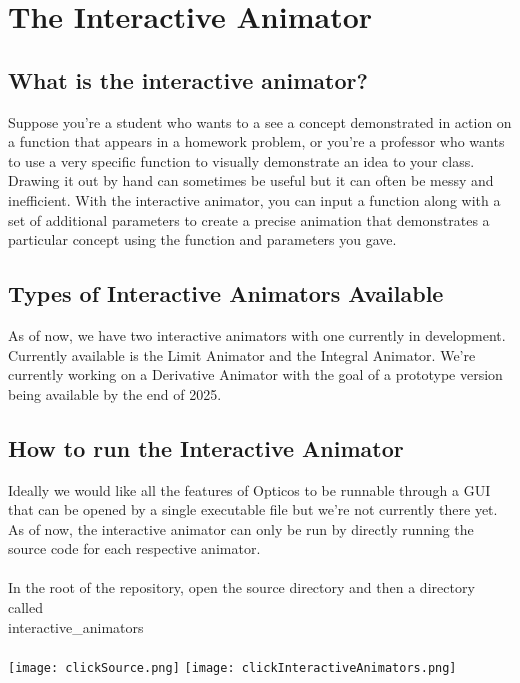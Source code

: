 \documentclass{article}
\begin{document}
\section*{The Interactive Animator}

\subsection*{What is the interactive animator?}
 Suppose you're a student who wants to a see a concept demonstrated in action on a function that appears in a homework problem, or you're a professor who wants to use a very specific function to visually demonstrate an idea to your class. Drawing it out by hand can sometimes be useful but it can often be messy and inefficient. With the interactive animator, you can input a function along with a set of additional parameters to create a precise animation that demonstrates a particular concept using the function and parameters you gave.

 \subsection*{Types of Interactive Animators Available}
 As of now, we have two interactive animators with one currently in development. Currently available is the Limit Animator and the Integral Animator. We're currently working on a Derivative Animator with the goal of a prototype version being available by the end of 2025.

 \subsection*{How to run the Interactive Animator}
 Ideally we would like all the features of Opticos to be runnable through a GUI that can be opened by a single executable file but we're not currently there yet. As of now, the interactive animator can only be run by directly running the source code for each respective animator.\\
 \\
 In the root of the repository, open the source directory and then a directory called\\interactive\_animators\\
 \\
\texttt{[image: clickSource.png]}
\texttt{[image: clickInteractiveAnimators.png]}
\pagebreak
\end{document}
